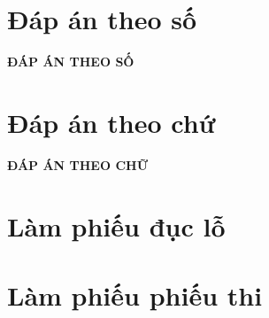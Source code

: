 \documentclass[11pt]{article}
\begin{document}
\newpage
\section{Đáp án theo số}
\setcounter{page}{1}
\indapanso
\lamtieude
\begin{center}
{\bf ĐÁP ÁN THEO SỐ}
\end{center}
\begin{center}
\begin{multicols}{6}
\begin{enumerate}[\socau]
\foreachproblem[bttracnghiem]{\item\thisproblem}
\end{enumerate}
\end{multicols}
\end{center}
\newpage
\section{Đáp án theo chứ}
\indapanchu
\lamtieude
\begin{center}
{\bf ĐÁP ÁN  THEO CHỮ}
\end{center}
\begin{center}
\begin{multicols}{10}
\begin{enumerate}[]
\foreachproblem[bttracnghiem]{\item\thisproblem}
\end{enumerate}
\end{multicols}
\end{center}

\newpage
\section{Làm phiếu đục lỗ}
\setcounter{page}{1}
\inphieuduclo
\lamphieuthi
\begin{center}
\begin{multicols}{3}
\begin{enumerate}[\causo]
\foreachproblem[bttracnghiem]{\item\thisproblem}
\end{enumerate}
\end{multicols}
\end{center}
\newpage
\section{Làm phiếu phiếu thi}
\inphieuthi
\lamphieuthi
\begin{center}
\begin{multicols}{3}
\begin{enumerate}[\causo]
\foreachproblem[bttracnghiem]{\item\thisproblem}
\end{enumerate}
\end{multicols}
\end{center}
 
\end{document}
